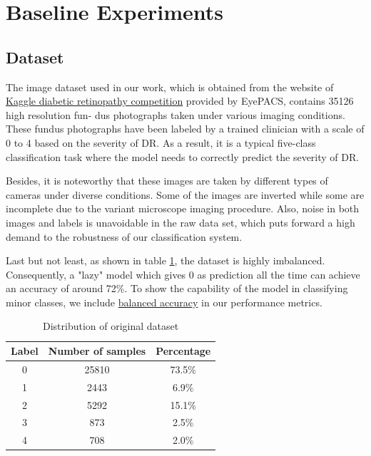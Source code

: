 \documentclass[../main.tex]{subfiles}
\begin{document}
\section{Baseline Experiments}
\label{sec:baseline_experiments}

\subsection{Dataset}
The image dataset used in our work, which is obtained from the website of \href{https://kaggle.com/c/diabetic-retinopathy-detection}{Kaggle diabetic retinopathy competition} provided by EyePACS, contains 35126 high resolution fun- dus photographs taken under various imaging conditions. These fundus photographs have been labeled by a trained clinician with a scale of 0 to 4 based on the severity of DR. As a result, it is a typical five-class classification task where the model needs to correctly predict the severity of DR. 

Besides, it is noteworthy that these images are taken by different types of cameras under diverse conditions. Some of the images are inverted while some are incomplete due to the variant microscope imaging procedure. Also, noise in both images and labels is unavoidable in the raw data set, which puts forward a high demand to the robustness of our classification system. 

Last but not least, as shown in table \ref{table:label_partition}, the dataset is highly imbalanced. Consequently,  a "lazy" model which gives 0 as prediction all the time can achieve an accuracy of around 72\%. To show the capability of the model in classifying minor classes, we include \href{https://scikit-learn.org/stable/modules/generated/sklearn.metrics.balanced_accuracy_score.html}{ balanced accuracy} in our performance metrics.

\begin{table}[htbp]
\linespread{1.5}
\renewcommand\arraystretch{1.25}
\centering
\begin{tabular}{|c|c|c|}
  \hline
    Label & Number of samples & Percentage\\
  \hline
    0 & 25810 & 73.5\% \\
    \hline
    1 & 2443 & 6.9\%\\
    \hline
    2 & 5292 & 15.1\%\\
    \hline
    3 & 873 & 2.5\%\\
    \hline
    4 & 708 & 2.0\% \\
    \hline
\end{tabular}
\caption{Distribution of original dataset}
\label{table:label_partition}   
\end{table}
\end{document}
